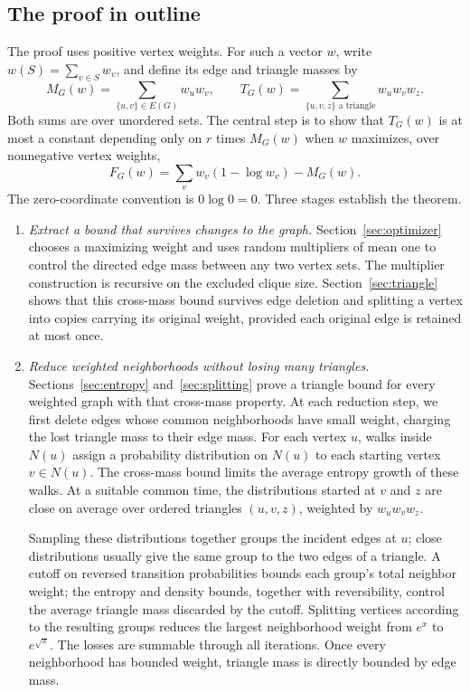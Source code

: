 \subsection{The proof in outline}

The proof uses positive vertex weights. For such a vector $w$, write
$w(S)=\sum_{v\in S}w_v$, and define its edge and triangle masses by
\[
 M_G(w)=\sum_{\{u,v\}\in E(G)}w_uw_v,
 \qquad
 T_G(w)=\sum_{\{u,v,z\}\text{ a triangle}}w_uw_vw_z.
\]
Both sums are over unordered sets. The central step is to show that
$T_G(w)$ is at most a constant depending only on $r$ times $M_G(w)$
when $w$ maximizes, over nonnegative vertex weights,
\[
 F_G(w)=\sum_v w_v(1-\log w_v)-M_G(w).
\]
The zero-coordinate convention is $0\log0=0$.
Three stages establish the theorem.

\begin{enumerate}
\item \emph{Extract a bound that survives changes to the graph.}
Section~\ref{sec:optimizer} chooses a maximizing weight and uses random
multipliers of mean one to control the directed edge mass between any
two vertex sets. The multiplier construction is recursive on the excluded
clique size. Section~\ref{sec:triangle} shows that this cross-mass
bound survives edge deletion and splitting a vertex into copies carrying
its original weight, provided each original edge is retained at most once.

\item \emph{Reduce weighted neighborhoods without losing many triangles.}
Sections~\ref{sec:entropy} and~\ref{sec:splitting} prove a triangle bound
for every weighted graph with that cross-mass property. At each reduction
step, we first delete edges whose common neighborhoods have small weight,
charging the lost triangle mass to their edge mass. For each vertex
$u$, walks inside $N(u)$ assign a probability distribution on $N(u)$ to
each starting vertex $v\in N(u)$. The cross-mass bound limits the average
entropy growth of these walks. At a suitable common time, the distributions
started at $v$ and $z$ are close on average over ordered triangles $(u,v,z)$,
weighted by $w_uw_vw_z$.

Sampling these distributions together groups the incident edges at $u$;
close distributions usually give the same group to the two edges of a
triangle. A cutoff on reversed transition probabilities bounds each
group's total neighbor weight; the entropy and density bounds, together
with reversibility, control the average triangle mass discarded by the
cutoff. Splitting vertices according to
the resulting groups reduces the largest neighborhood weight from
$e^x$ to $e^{\sqrt{x}}$. The losses are summable through all iterations.
Once every neighborhood has bounded weight, triangle mass is directly
bounded by edge mass.


\end{enumerate}

